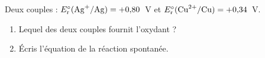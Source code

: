 \documentclass[11pt,a4paper]{article}
\begin{document}
\begin{exo}
Deux couples : $E_{\mathrm{r}}^{\circ}(\ce{Ag+}/\ce{Ag})=+0{,}80$~V et
$E_{\mathrm{r}}^{\circ}(\ce{Cu^{2+}}/\ce{Cu})=+0{,}34$~V.
\begin{enumerate}[label=\alph*)]
  \item Lequel des deux couples fournit l'oxydant ?
  \item Écris l'équation de la réaction spontanée.
\end{enumerate}
\end{exo}
\end{document}
